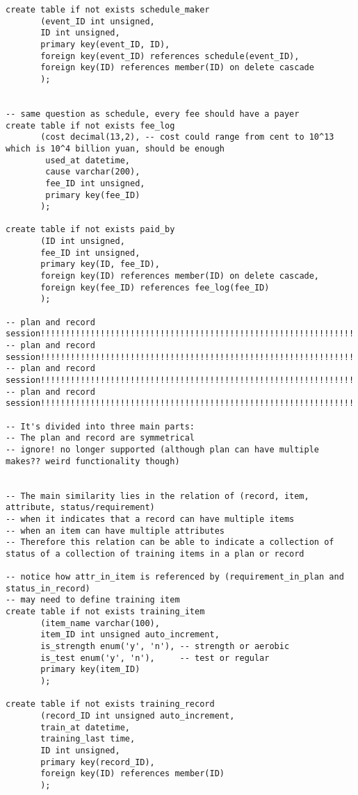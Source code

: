 \begin{Verbatim}[]
create table if not exists schedule_maker
       (event_ID int unsigned,
       ID int unsigned,
       primary key(event_ID, ID),
       foreign key(event_ID) references schedule(event_ID),
       foreign key(ID) references member(ID) on delete cascade
       );


-- same question as schedule, every fee should have a payer
create table if not exists fee_log
       (cost decimal(13,2), -- cost could range from cent to 10^13 which is 10^4 billion yuan, should be enough
        used_at datetime,
        cause varchar(200),
        fee_ID int unsigned,
        primary key(fee_ID)
       );

create table if not exists paid_by
       (ID int unsigned,
       fee_ID int unsigned,
       primary key(ID, fee_ID),
       foreign key(ID) references member(ID) on delete cascade,
       foreign key(fee_ID) references fee_log(fee_ID)
       );

-- plan and record session!!!!!!!!!!!!!!!!!!!!!!!!!!!!!!!!!!!!!!!!!!!!!!!!!!!!!!!!!!!!!!!!!!
-- plan and record session!!!!!!!!!!!!!!!!!!!!!!!!!!!!!!!!!!!!!!!!!!!!!!!!!!!!!!!!!!!!!!!!!!
-- plan and record session!!!!!!!!!!!!!!!!!!!!!!!!!!!!!!!!!!!!!!!!!!!!!!!!!!!!!!!!!!!!!!!!!!
-- plan and record session!!!!!!!!!!!!!!!!!!!!!!!!!!!!!!!!!!!!!!!!!!!!!!!!!!!!!!!!!!!!!!!!!!

-- It's divided into three main parts:
-- The plan and record are symmetrical
-- ignore! no longer supported (although plan can have multiple makes?? weird functionality though)


-- The main similarity lies in the relation of (record, item, attribute, status/requirement)
-- when it indicates that a record can have multiple items
-- when an item can have multiple attributes
-- Therefore this relation can be able to indicate a collection of status of a collection of training items in a plan or record

-- notice how attr_in_item is referenced by (requirement_in_plan and status_in_record)
-- may need to define training item
create table if not exists training_item
       (item_name varchar(100),
       item_ID int unsigned auto_increment,
       is_strength enum('y', 'n'), -- strength or aerobic
       is_test enum('y', 'n'),     -- test or regular
       primary key(item_ID)
       );

create table if not exists training_record
       (record_ID int unsigned auto_increment,
       train_at datetime,
       training_last time,
       ID int unsigned,
       primary key(record_ID),
       foreign key(ID) references member(ID)
       );


\end{Verbatim}

